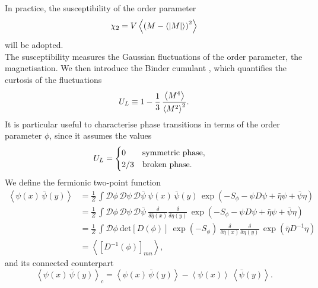 In practice, the susceptibility of the order parameter 
\begin{equation}
    \chi_2 = V \left\langle \left(M-\left\langle |M| \right\rangle\right)^2 \right\rangle
    \label{eq:abs_susceptibility}
\end{equation}
will be adopted. \\
The susceptibility measures the Gaussian fluctuations of the order parameter, the magnetisation. We then introduce the Binder cumulant \cite{binder2010monte}, which quantifies the curtosis of the fluctuations
\begin{equation*}
    U_L \equiv 1 - \frac{1}{3} \, \frac{\left\langle M^4 \right\rangle}{\left\langle M^2 \right\rangle^2}.
\end{equation*}
It is particular useful to characterise phase transitions in terms of the order parameter $\phi$, since it assumes the values 
\begin{equation*}
    U_L = \begin{cases}0 \quad \hphantom{/3} \text{symmetric phase}, \\ 2/3 \quad \text{broken phase}. \end{cases}
\end{equation*}
We define the fermionic two-point function
\begin{equation} 
\begin{aligned}
    \left\langle \psi(x) \, \bar\psi(y) \right\rangle 
    &= \frac{1}{Z} \, \int \mathcal{D}\phi \, \mathcal{D}\psi \, \mathcal{D}\bar\psi \ \psi(x) \, \bar\psi(y) \, \exp \left( - S_\phi - \psi D \psi + \bar\eta \psi + \bar \psi \eta \right) \\
    &= \frac{1}{Z} \, \int \mathcal{D}\phi \, \mathcal{D}\psi \, \mathcal{D}\bar\psi \ \frac{\delta}{\delta \bar \eta(x)} \frac{\delta}{\delta \eta(y)} \, \exp \left( - S_\phi - \psi D \psi + \bar\eta \psi + \bar \psi \eta \right) \\
    &= \frac{1}{Z} \, \int \mathcal{D}\phi \ \text{det}\left[D(\phi)\right] \ \exp \left( - S_\phi \right) \ \frac{\delta}{\delta \bar \eta(x)} \frac{\delta}{\delta \eta(y)} \, \exp\left( \bar\eta D^{-1} \eta \right) \\
    &= \left\langle \left[D^{-1}(\phi)\right]_{mn}\right\rangle,
\end{aligned}
\label{eq:D_inv_condensate}
\end{equation}
and its connected counterpart
\begin{equation*}
    \left\langle \psi(x) \, \bar\psi(y) \right\rangle_c = \left\langle \psi(x) \, \bar\psi(y) \right\rangle  - \left\langle \psi(x) \right\rangle \, \left\langle\bar\psi(y) \right\rangle .
\end{equation*}
